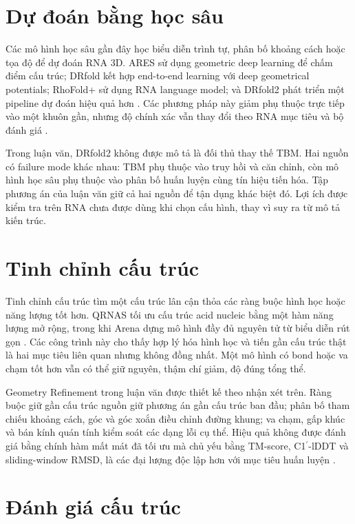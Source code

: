 \documentclass[12pt,a4paper,oneside]{report}
\newcommand{\cprime}{C1$^{\prime}$}
\begin{document}
\section{Dự đoán bằng học sâu}

Các mô hình học sâu gần đây học biểu diễn trình tự, phân bố khoảng cách hoặc tọa độ để
dự đoán RNA 3D. ARES sử dụng geometric deep learning để chấm điểm cấu trúc; DRfold kết
hợp end-to-end learning với deep geometrical potentials; RhoFold+ sử dụng RNA language
model; và DRfold2 phát triển một pipeline dự đoán hiệu quả hơn
\cite{ares,drfold,rhofoldplus,drfold2}. Các phương pháp này giảm phụ thuộc trực tiếp vào
một khuôn gần, nhưng độ chính xác vẫn thay đổi theo RNA mục tiêu và bộ đánh giá
\cite{state_of_rnart,drfold2}.

Trong luận văn, DRfold2 không được mô tả là đối thủ thay thế TBM. Hai nguồn có failure
mode khác nhau: TBM phụ thuộc vào truy hồi và căn chỉnh, còn mô hình học sâu phụ thuộc
vào phân bố huấn luyện cùng tín hiệu tiến hóa. Tập phương án của luận văn giữ cả hai
nguồn để tận dụng khác biệt đó. Lợi ích được kiểm tra trên RNA chưa được dùng khi chọn
cấu hình, thay vì suy ra từ mô tả kiến trúc.

\section{Tinh chỉnh cấu trúc}

Tinh chỉnh cấu trúc tìm một cấu trúc lân cận thỏa các ràng buộc hình học hoặc năng lượng tốt hơn.
QRNAS tối ưu cấu trúc acid nucleic bằng một hàm năng lượng mở rộng, trong khi Arena dựng
mô hình đầy đủ nguyên tử từ biểu diễn rút gọn \cite{qrnas,arena}. Các công trình này
cho thấy hợp lý hóa hình học và tiến gần cấu trúc thật là hai mục tiêu liên quan nhưng không
đồng nhất. Một mô hình có bond hoặc va chạm tốt hơn vẫn có thể giữ nguyên, thậm chí giảm,
độ đúng tổng thể.

Geometry Refinement trong luận văn được thiết kế theo nhận xét trên. Ràng buộc giữ gần
cấu trúc nguồn giữ phương án gần cấu trúc ban đầu; phân bố tham chiếu khoảng cách, góc
và góc xoắn điều chỉnh đường khung;
va chạm, gấp khúc và bán kính quán tính kiểm soát các dạng lỗi cụ thể. Hiệu quả không được
đánh giá bằng chính hàm mất mát đã tối ưu mà chủ yếu bằng TM-score, \cprime{}-lDDT và
sliding-window RMSD, là các đại lượng độc lập hơn với mục tiêu huấn luyện
\cite{tm_score,lddt,usalign}.

\section{Đánh giá cấu trúc}
\end{document}
